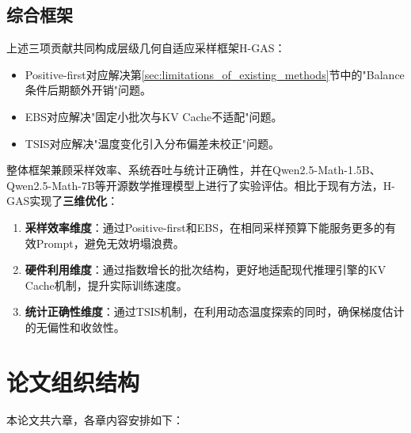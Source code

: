 \subsection{综合框架}
\label{subsec:framework_integration}

上述三项贡献共同构成层级几何自适应采样框架H-GAS：
\begin{itemize}
    \item Positive-first对应解决第\ref{sec:limitations_of_existing_methods}节中的"Balance条件后期额外开销"问题。
    \item EBS对应解决"固定小批次与KV Cache不适配"问题。
    \item TSIS对应解决"温度变化引入分布偏差未校正"问题。
\end{itemize}

整体框架兼顾采样效率、系统吞吐与统计正确性，并在Qwen2.5-Math-1.5B、Qwen2.5-Math-7B等开源数学推理模型上进行了实验评估。相比于现有方法，H-GAS实现了\textbf{三维优化}：
\begin{enumerate}
    \item \textbf{采样效率维度}：通过Positive-first和EBS，在相同采样预算下能服务更多的有效Prompt，避免无效坍塌浪费。
    \item \textbf{硬件利用维度}：通过指数增长的批次结构，更好地适配现代推理引擎的KV Cache机制，提升实际训练速度。
    \item \textbf{统计正确性维度}：通过TSIS机制，在利用动态温度探索的同时，确保梯度估计的无偏性和收敛性。
\end{enumerate}

\section{论文组织结构}
\label{sec:organization}

本论文共六章，各章内容安排如下：

